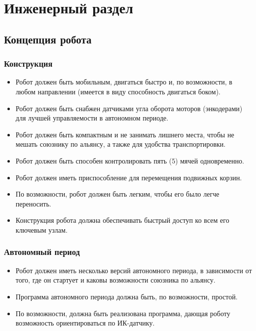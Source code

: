 \section{Инженерный раздел}
\subsection{Концепция робота}
\subsubsection{Конструкция}
\begin{itemize}
	\item Робот должен быть мобильным, двигаться быстро и, по возможности, в любом направлении (имеется в виду способность двигаться боком).
	\item Робот должен быть снабжен датчиками угла оборота моторов (энкодерами) для лучшей управляемости в автономном периоде.
	\item Робот должен быть компактным и не занимать лишнего места, чтобы не мешать союзнику по альянсу, а также для удобства транспортировки.
	\item Робот должен быть способен контролировать пять (5) мячей одновременно.
	\item Робот должен иметь приспособление для перемещения подвижных корзин.
	\item По возможности, робот должен быть легким, чтобы его было легче переносить.
	\item Конструкция робота должна обеспечивать быстрый доступ ко всем его ключевым узлам.
\end{itemize}
\subsubsection{Автономный период}
\begin{itemize}
	\item Робот должен иметь несколько версий автономного периода, в зависимости от того, где он стартует и каковы возможности союзника по альянсу.
	\item Программа автономного периода должна быть, по возможности, простой.
	\item По возможности, должна быть реализована программа, дающая роботу возможность ориентироваться по ИК-датчику.
\end{itemize}
